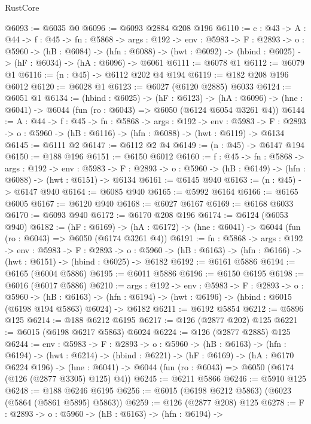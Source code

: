 \begin{lexlean}{RustCore}
\begin{coremodule}
@6093 := @6035 @0
@6096 := @6093 @2884 @208 @196
@6110 := {c : @43} ->
  {A : @44} ->
  {f : @45} ->
  {fn : @5868} ->
  {args : @192} ->
  {env : @5983} ->
  {F : @2893} ->
  {o : @5960} ->
  (hB : @6084) ->
  (hfn : @6088) -> (hwt : @6092) -> (hbind : @6025) -> (hF : @6034) -> (hA : @6096) -> @6061
@6111 := @6078 @1
@6112 := @6079 @1
@6116 := (n : @45) -> @6112 @202 @4 @194
@6119 := @182 @208 @196 @6012
@6120 := @6028 @1
@6123 := @6027 (@6120 @2885) @6033
@6124 := @6051 @1
@6134 := (hbind : @6025) ->
  (hF : @6123) ->
  (hA : @6096) -> (hne : @6041) -> @6044 (fun (ro : @6043) => @6050 (@6124 @6054 @3261 @4))
@6144 := {A : @44} ->
  {f : @45} ->
  {fn : @5868} ->
  {args : @192} ->
  {env : @5983} ->
  {F : @2893} -> {o : @5960} -> (hB : @6116) -> (hfn : @6088) -> (hwt : @6119) -> @6134
@6145 := @6111 @2
@6147 := @6112 @2 @4
@6149 := (n : @45) -> @6147 @194
@6150 := @188 @196
@6151 := @6150 @6012
@6160 := {f : @45} ->
  {fn : @5868} ->
  {args : @192} ->
  {env : @5983} ->
  {F : @2893} -> {o : @5960} -> (hB : @6149) -> (hfn : @6088) -> (hwt : @6151) -> @6134
@6161 := @6145 @940
@6163 := (n : @45) -> @6147 @940
@6164 := @6085 @940
@6165 := @5992 @6164
@6166 := @6165 @6005
@6167 := @6120 @940
@6168 := @6027 @6167
@6169 := @6168 @6033
@6170 := @6093 @940
@6172 := @6170 @208 @196
@6174 := @6124 (@6053 @940)
@6182 := (hF : @6169) ->
  (hA : @6172) -> (hne : @6041) -> @6044 (fun (ro : @6043) => @6050 (@6174 @3261 @4))
@6191 := {fn : @5868} ->
  {args : @192} ->
  {env : @5983} ->
  {F : @2893} ->
  {o : @5960} -> (hB : @6163) -> (hfn : @6166) -> (hwt : @6151) -> (hbind : @6025) -> @6182
@6192 := @6161 @5886
@6194 := @6165 (@6004 @5886)
@6195 := @6011 @5886
@6196 := @6150 @6195
@6198 := @6016 (@6017 @5886)
@6210 := {args : @192} ->
  {env : @5983} ->
  {F : @2893} ->
  {o : @5960} ->
  (hB : @6163) ->
  (hfn : @6194) -> (hwt : @6196) -> (hbind : @6015 (@6198 @194 @5863) @6024) -> @6182
@6211 := @6192 @5854
@6212 := @5896 @125
@6214 := @188 @6212 @6195
@6217 := @126 (@2877 @202) @125
@6221 := @6015 (@6198 @6217 @5863) @6024
@6224 := @126 (@2877 @2885) @125
@6244 := {env : @5983} ->
  {F : @2893} ->
  {o : @5960} ->
  (hB : @6163) ->
  (hfn : @6194) ->
  (hwt : @6214) ->
  (hbind : @6221) ->
  (hF : @6169) ->
  (hA : @6170 @6224 @196) ->
  (hne : @6041) -> @6044 (fun (ro : @6043) => @6050 (@6174 (@126 (@2877 @3305) @125) @4))
@6245 := @6211 @5866
@6246 := @5910 @125
@6248 := @188 @6246 @6195
@6256 := @6015 (@6198 @6212 @5863) (@6023 (@5864 (@5861 @5895) @5863))
@6259 := @126 (@2877 @208) @125
@6278 := {F : @2893} ->
  {o : @5960} ->
  (hB : @6163) ->
  (hfn : @6194) ->

\end{coremodule}
\end{lexlean}

